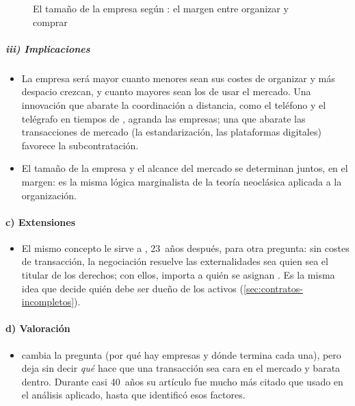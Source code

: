 \documentclass[11pt]{article}
\begin{document}
\begin{figure}[H]
\centering
\caption{El tamaño de la empresa según : el margen entre organizar y comprar}\label{fig:coase-margen}
\end{figure}

\subparagraph{iii) Implicaciones}

\begin{itemize}
\item La empresa será mayor cuanto menores sean sus costes de organizar y más despacio crezcan, y cuanto mayores sean los de usar el mercado. Una innovación que abarate la coordinación a distancia, como el teléfono y el telégrafo en tiempos de , agranda las empresas\nocite{Coase1937Nature}; una que abarate las transacciones de mercado (la estandarización, las plataformas digitales) favorece la subcontratación.
\item El tamaño de la empresa y el alcance del mercado se determinan juntos, en el margen: es la misma lógica marginalista de la teoría neoclásica aplicada a la organización.
\end{itemize}

\paragraph{c) Extensiones}

\begin{itemize}
\item El mismo concepto le sirve a \textcite{Coase1960Problem}, 23~años después, para otra pregunta: sin costes de transacción, la negociación resuelve las externalidades sea quien sea el titular de los derechos; con ellos, importa a quién se asignan . Es la misma idea que decide quién debe ser dueño de los activos (\ref{sec:contratos-incompletos}).
\end{itemize}

\paragraph{d) Valoración}

\begin{itemize}
\item {} cambia la pregunta (por qué hay empresas y dónde termina cada una), pero deja sin decir \emph{qué} hace que una transacción sea cara en el mercado y barata dentro. Durante casi 40~años su artículo fue mucho más citado que usado en el análisis aplicado, hasta que  identificó esos factores.
\end{itemize}
\end{document}
